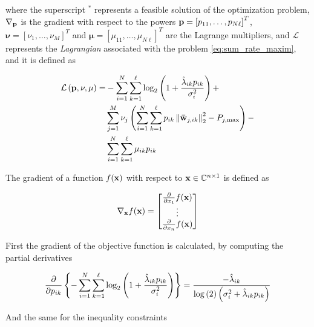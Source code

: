 \noindent
where the superscript $^\ast$ represents a feasible solution of the optimization
problem, $\mathbf{\nabla}_{\mathbf{p}}$ is the gradient with respect to the powers $\mathbf{p} = 
\left[p_{11}, \ldots, p_{N\ell}\right]^T$, $\mathbf{\nu} = \left[\nu_1, \ldots,
\nu_M\right]^T$ and $\mathbf{\mu} = \left[\mu_{11}, \ldots, \mu_{N\ell}
\right]^T$ are the Lagrange multipliers, and $\mathcal{L}$ represents the
\emph{Lagrangian} associated with the problem \eqref{eq:sum_rate_maxim}, and it
is defined as

\begin{equation} \label{eq:lagrangian}
\begin{aligned}
    \mathcal{L}\left(\mathbf{p}, \mathbf{\nu}, \mathbf{\mu}\right) =
    & -\sum\limits_{i = 1}^N
        \sum\limits_{k = 1}^\ell \log_2\left( 1 +
        \frac{\hat{\lambda}_{ik} p_{ik}}{\sigma_i^2} \right) + \\
    & \sum\limits_{j = 1}^M \nu_j\left(
        \sum\limits_{i = 1}^N \sum\limits_{k = 1}^\ell p_{ik} \left\|
        \mathbf{\bar{w}}_{j,ik} \right\|_2^2 - P_{j,\max}\right) - \\
    & \sum\limits_{i = 1}^N \sum\limits_{k = 1}^\ell \mu_{ik} p_{ik}
\end{aligned}
\end{equation}

The gradient of a function $f(\mathbf{x})$ with respect to $\mathbf{x} \in \mathbb{C}^{n \times 1}$ is
defined as

\begin{equation} \label{eq:gradient}
    \mathbf{\nabla}_{\mathbf{x}}f(\mathbf{x}) = \begin{bmatrix}
        \frac{\partial}{\partial x_1}f(\mathbf{x}) \\
        \vdots \\
        \frac{\partial}{\partial x_n}f(\mathbf{x})
    \end{bmatrix}
\end{equation}

First the gradient of the objective function is calculated, by computing the
partial derivatives

\begin{equation} \label{eq:gradient_objective}
    \frac{\partial}{\partial p_{ik}} \left\{
        -\sum\limits_{i = 1}^N
        \sum\limits_{k = 1}^\ell \log_2\left( 1 +
        \frac{\hat{\lambda}_{ik} p_{ik}}{\sigma_i^2} \right)
    \right\} = \frac{-\hat{\lambda}_{ik}}{\log\left(2\right)\left(\sigma_i^2 +
    \hat{\lambda}_{ik} p_{ik}\right)}
\end{equation}

And the same for the inequality constraints

